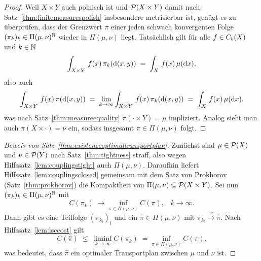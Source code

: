 \documentclass[../main/main.tex]{subfiles}
\begin{document}
	\begin{proof}
		Weil $X \times Y$ auch polnisch ist und $\mathcal{P}(X \times Y)$ damit nach Satz~\ref{thm:finitemeasurespolish} insbesondere metrisierbar ist, genügt es zu überprüfen, dass der Grenzwert $\pi$ einer jeden schwach konvergenten Folge $(\pi_k)_k \in \Pi(\mu, \nu)^{\mathbb{N}}$ wieder in $\Pi(\mu, \nu)$ liegt. Tatsächlich gilt für alle $f \in C_b(X)$ und $k \in \mathbb{N}$
		\[ \int_{X \times Y} \, f(x) \, \pi_k(\mathrm{d}(x, y)) \; = \; \int_{X} \, f(x) \, \mu(\mathrm{d}x) \text{,} \]
		also auch 
		\[ \int_{X \times Y} \, f(x) \, \pi(\mathrm{d}(x, y)) \; = \; \lim_{k \to \infty} \int_{X \times Y} \, f(x) \, \pi_k(\mathrm{d}(x, y)) \; = \; \int_{X} \, f(x) \, \mu(\mathrm{d}x) \text{,} \]
		was nach Satz~\ref{thm:measureequality} $\pi(\cdot \times Y) = \mu$ impliziert. Analog sieht man auch $\pi(X \times \cdot) = \nu$ ein, sodass insgesamt $\pi \in \Pi(\mu, \nu)$ folgt.
	\end{proof}

	\begin{proof}[Beweis von Satz~\ref{thm:existenceoptimaltransportplan}]
		Zunächst sind $\mu \in \mathcal{P}(X)$ und $\nu \in \mathcal{P}(Y)$ nach Satz~\ref{thm:tightness} straff, also wegen Hilfssatz~\ref{lem:couplingstight} auch 
		$\Pi(\mu, \nu)$. Daraufhin liefert Hilfssatz~\ref{lem:couplingsclosed} gemeinsam mit dem Satz von Prokhorov (Satz~\ref{thm:prokhorov}) die Kompaktheit von $\Pi(\mu, \nu) \subseteq \mathcal{P}(X \times Y)$.
		Sei nun $(\pi_k)_k \in \Pi(\mu, \nu)^{\mathbb{N}}$ mit
		\[ C(\pi_k) \; \to \inf_{\pi \in \Pi(\mu, \nu)} C(\pi) \text{,} \quad k \to \infty \text{.} \]
		Dann gibt es eine Teilfolge $(\pi_{k_l})_l$ und ein $\hat{\pi} \in \Pi(\mu, \nu)$ mit $\pi_{k_l} \xrightarrow{w} \hat{\pi}$. Nach Hilfssatz~\ref{lem:lsccost} gilt
		\[ C(\hat{\pi}) \; \leq \; \liminf_{k \to \infty} C(\pi_k) \; = \inf_{\pi \in \Pi(\mu, \nu)} C(\pi) \text{,} \]
		was bedeutet, dass $\hat{\pi}$ ein optimaler Transportplan zwischen $\mu$ und $\nu$ ist. 
	\end{proof}
	
\end{document}
